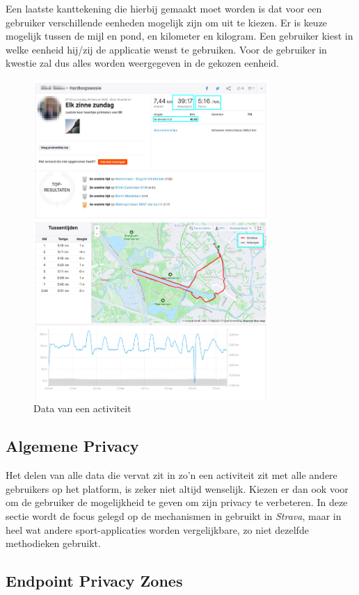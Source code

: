 Een laatste kanttekening die hierbij gemaakt moet worden is dat voor een
gebruiker verschillende eenheden mogelijk zijn om uit te kiezen. Er is keuze
mogelijk tussen de mijl en pond, en kilometer en kilogram. Een gebruiker kiest
in welke eenheid hij/zij de applicatie wenst te gebruiken. Voor de gebruiker in
kwestie zal dus alles worden weergegeven in de gekozen eenheid.
\begin{figure}
    \centering
    \includegraphics[width=0.8\textwidth]{fig/VoorbeeldActiviteit_Personal.png}
    \caption{Data van een activiteit}\label{fig:activityData}
\end{figure}

\subsection{Algemene Privacy}\label{Algemene Privacy}
Het delen van alle data die vervat zit in zo'n een activiteit zit met alle
andere gebruikers op het platform, is zeker niet altijd wenselijk. Kiezen er
dan ook voor om de gebruiker de mogelijkheid te geven om zijn privacy te
verbeteren. In deze sectie wordt de focus gelegd op de mechanismen in gebruikt
in \textit{Strava}, maar in heel wat andere sport-applicaties worden
vergelijkbare, zo niet dezelfde methodieken gebruikt.

\subsection{Endpoint Privacy Zones}\label{EPZ}